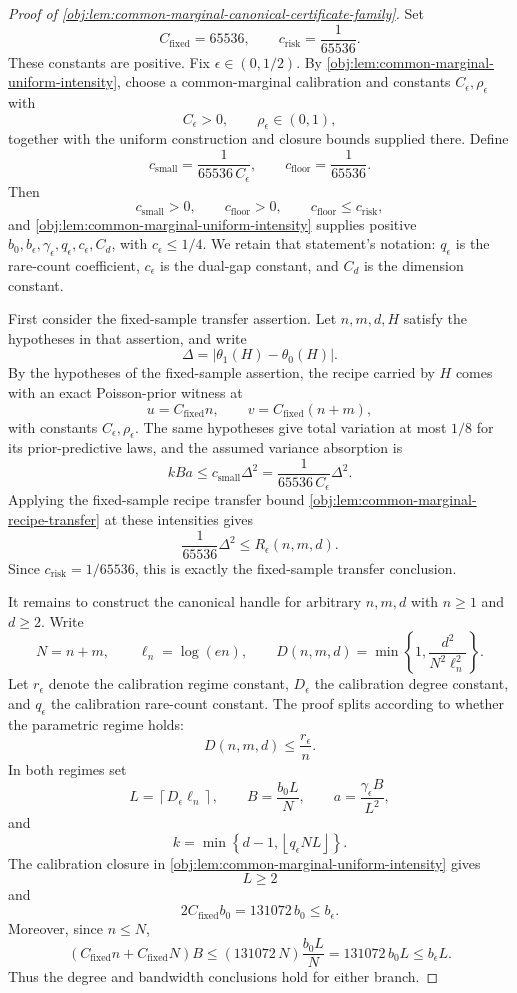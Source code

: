 \documentclass[11pt]{article}
\begin{document}
\begin{proof}[Proof of \cref{obj:lem:common-marginal-canonical-certificate-family}]
Set
\[
C_{\mathrm{fixed}}=65536,
\qquad
c_{\mathrm{risk}}=\frac1{65536}.
\]
These constants are positive.  Fix \(\epsilon\in(0,1/2)\).  By \cref{obj:lem:common-marginal-uniform-intensity}, choose a common-marginal calibration and constants \(C_\epsilon,\rho_\epsilon\) with
\[
C_\epsilon>0,\qquad \rho_\epsilon\in(0,1),
\]
together with the uniform construction and closure bounds supplied there.  Define
\[
c_{\mathrm{small}}=\frac{1}{65536\,C_\epsilon},
\qquad
c_{\mathrm{floor}}=\frac1{65536}.
\]
Then
\[
c_{\mathrm{small}}>0,\qquad c_{\mathrm{floor}}>0,\qquad
c_{\mathrm{floor}}\le c_{\mathrm{risk}},
\]
and \cref{obj:lem:common-marginal-uniform-intensity} supplies positive
\(b_0,b_\epsilon,\gamma_\epsilon,q_\epsilon,c_\epsilon,C_d\), with
\(c_\epsilon\le 1/4\).  We retain that statement's notation: \(q_\epsilon\) is the
rare-count coefficient, \(c_\epsilon\) is the dual-gap constant, and \(C_d\) is
the dimension constant. %

First consider the fixed-sample transfer assertion.  Let \(n,m,d,H\) satisfy the hypotheses in that assertion, and write
\[
\Delta
=
\left|\theta_1(H)-\theta_0(H)\right|.
\]
By the hypotheses of the fixed-sample assertion, the recipe carried by \(H\) comes with an exact Poisson-prior witness at
\[
u=C_{\mathrm{fixed}}n,
\qquad
v=C_{\mathrm{fixed}}(n+m),
\]
with constants \(C_\epsilon,\rho_\epsilon\).  The same hypotheses give total variation at most \(1/8\) for its prior-predictive laws, and the assumed variance absorption is
\[
kBa\le c_{\mathrm{small}}\Delta^2
=
\frac{1}{65536\,C_\epsilon}\Delta^2 .
\]
Applying the fixed-sample recipe transfer bound \cref{obj:lem:common-marginal-recipe-transfer} at these intensities gives
\[
\frac1{65536}\Delta^2
\le
R_\epsilon(n,m,d).
\]
Since \(c_{\mathrm{risk}}=1/65536\), this is exactly the fixed-sample transfer conclusion. %

It remains to construct the canonical handle for arbitrary \(n,m,d\) with \(n\ge1\) and \(d\ge2\).  Write
\[
N=n+m,\qquad \ell_n=\log(en),
\qquad
D(n,m,d)=\min\left\{1,\frac{d^2}{N^2\ell_n^2}\right\}.
\]
Let \(r_\epsilon\) denote the calibration regime constant, \(D_\epsilon\) the calibration degree constant, and \(q_\epsilon\) the calibration rare-count constant.  The proof splits according to whether the parametric regime holds:
\[
D(n,m,d)\le \frac{r_\epsilon}{n}.
\]
In both regimes set
\[
L=\left\lceil D_\epsilon\ell_n\right\rceil,\qquad
B=\frac{b_0L}{N},\qquad
a=\frac{\gamma_\epsilon B}{L^2},
\]
and
\[
k=\min\left\{d-1,\left\lfloor q_\epsilon NL\right\rfloor\right\}.
\]
The calibration closure in \cref{obj:lem:common-marginal-uniform-intensity} gives
\[
L\ge2
\]
and
\[
2C_{\mathrm{fixed}}b_0=131072\,b_0\le b_\epsilon .
\]
Moreover, since \(n\le N\),
\[
(C_{\mathrm{fixed}}n+C_{\mathrm{fixed}}N)B
\le
(131072\,N)\frac{b_0L}{N}
=
131072\,b_0L
\le b_\epsilon L.
\]
Thus the degree and bandwidth conclusions hold for either branch. %


\end{proof}
\end{document}
